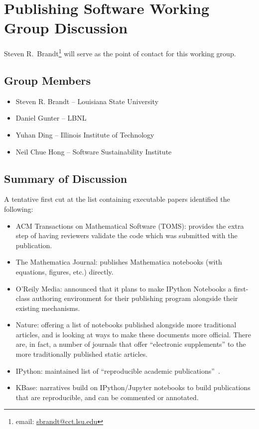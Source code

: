\section{Publishing Software Working Group Discussion}
\label{sec:appendix_publishing_SW}

Steven R.\ Brandt\footnote{email: \href{mailto:sbrandt@cct.lsu.edu}{sbrandt@cct.lsu.edu}} will serve as the point of contact for this working group.

\subsection{Group Members}

\begin{itemize}
\item Steven R. Brandt -- Louisiana State University
\item Daniel Gunter -- LBNL
\item Yuhan Ding -- Illinois Institute of Technology
\item Neil Chue Hong -- Software Sustainability Institute
\end{itemize}

\subsection{Summary of Discussion}

A tentative first cut at the list containing executable papers identified the following:
\begin{itemize}
\item ACM Transactions on Mathematical Software (TOMS): provides the extra step
 of having reviewers validate the code which was submitted with the publication.
\item The Mathematica Journal: publishes Mathematica notebooks (with equations,
figures, etc.) directly.
\item O'Reily Media: announced that it plans to make IPython Notebooks a first-class
 authoring environment for their publishing program alongside their existing mechanisms.
\item Nature: offering a list of notebooks published alongside more traditional articles,
 and is looking at ways to make these documents more official. There are, in fact, a
 number of journals that offer ``electronic supplements'' to the more traditionally published
 static articles.
\item IPython: maintained list of ``reproducible academic publications''~\cite{ipython-pubs}.
\item KBase: narratives build on IPython\slash Jupyter notebooks to build publications that are
  reproducible, and can be commented or annotated.
\end{itemize}

